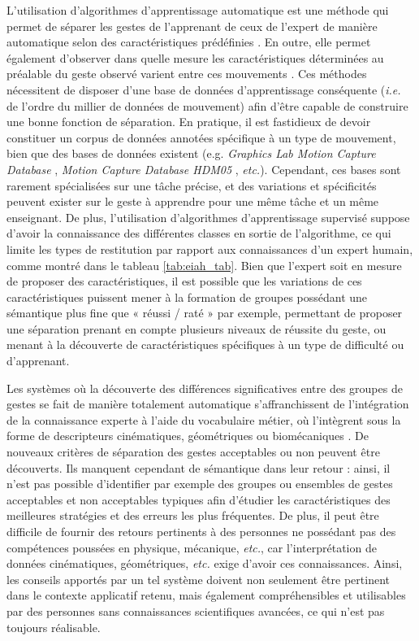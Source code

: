 L'utilisation d'algorithmes d'apprentissage automatique est une méthode qui permet de séparer les gestes de l'apprenant de ceux de l'expert de manière automatique selon des caractéristiques prédéfinies \parencite{Ng2008}. En outre, elle permet également d'observer dans quelle mesure les caractéristiques déterminées au préalable du geste observé varient entre ces mouvements \parencite{BMT_2015}. Ces méthodes nécessitent de disposer d'une base de données d'apprentissage conséquente (\textit{i.e.} de l'ordre du millier de données de mouvement) afin d'être capable de construire une bonne fonction de séparation. En pratique, il est fastidieux de devoir constituer un corpus de données annotées spécifique à un type de mouvement, bien que des bases de données existent (e.g. \textit{Graphics Lab Motion Capture Database} \parencite{CMUDatabase}, \textit{Motion Capture Database HDM05} \parencite{HDM05Database}, \textit{etc.}). Cependant, ces bases sont rarement spécialisées sur une tâche précise, et des variations et spécificités peuvent exister sur le geste à apprendre pour une même tâche et un même enseignant. De plus, l'utilisation d'algorithmes d'apprentissage supervisé suppose d'avoir la connaissance des différentes classes en sortie de l'algorithme, ce qui limite les types de restitution par rapport aux connaissances d'un expert humain, comme montré dans le tableau \ref{tab:eiah_tab}. Bien que l'expert soit en mesure de proposer des caractéristiques, il est possible que les variations de ces caractéristiques puissent mener à la formation de groupes possédant une sémantique plus fine que « réussi / raté » par exemple, permettant de proposer une séparation prenant en compte plusieurs niveaux de réussite du geste, ou menant à la découverte de caractéristiques spécifiques à un type de difficulté ou d'apprenant.

Les systèmes où la découverte des différences significatives entre des groupes de gestes se fait de manière totalement automatique s'affranchissent de l'intégration de la connaissance experte à l'aide du vocabulaire métier, où l'intègrent sous la forme de descripteurs cinématiques, géométriques ou biomécaniques  \parencite{Makio2007DoS} \parencite{Pirsiavash2014AQA}. De nouveaux critères de séparation des gestes acceptables ou non peuvent être découverts. Ils manquent cependant de sémantique dans leur retour : ainsi, il n'est pas possible d'identifier par exemple des groupes ou ensembles de gestes acceptables et non acceptables typiques afin d'étudier les caractéristiques des meilleures stratégies et des erreurs les plus fréquentes. De plus, il peut être difficile de fournir des retours pertinents à des personnes ne possédant pas des compétences poussées en physique, mécanique, \textit{etc.}, car l'interprétation de données cinématiques, géométriques, \textit{etc.} exige d'avoir ces connaissances. Ainsi, les conseils apportés par un tel système doivent non seulement être pertinent dans le contexte applicatif retenu, mais également compréhensibles et utilisables par des personnes sans connaissances scientifiques avancées, ce qui n'est pas toujours réalisable.


